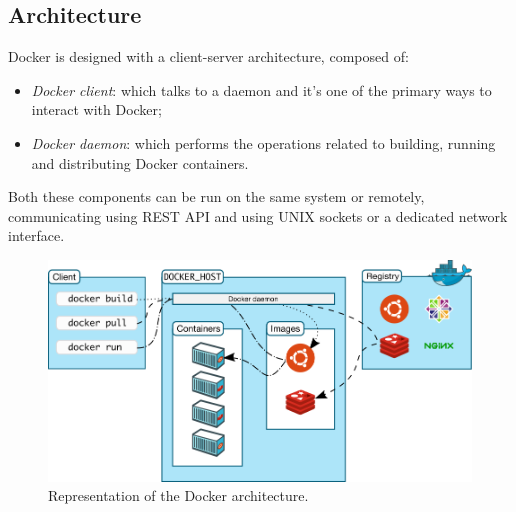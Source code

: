 \subsection{Architecture}
Docker is designed with a client-server architecture, composed of:
\begin{itemize}
	\item \textit{Docker client}: which talks to a daemon and it's one of the primary ways to interact with Docker;
	\item \textit{Docker daemon}: which performs the operations related to building, running and distributing Docker containers.
\end{itemize}
Both these components can be run on the same system or remotely, communicating using REST API and using UNIX sockets or a dedicated network interface.
\begin{figure}[h!]
	\centering
	\includegraphics[width=1\linewidth]{"immagini/Technologies/Docker architecture"}
	\caption[Representation of the Docker architecture.]{Representation of the Docker architecture.}
	\label{fig:docker-architecture}
\end{figure}


